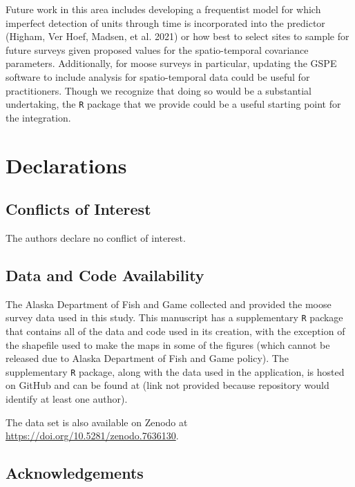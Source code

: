 \documentclass[]{article}    %
\begin{document}
Future work in this area includes developing a frequentist model for
which imperfect detection of units through time is incorporated into the
predictor (Higham, Ver Hoef, Madsen, et al. 2021) or how best to select
sites to sample for future surveys given proposed values for the
spatio-temporal covariance parameters. Additionally, for moose surveys
in particular, updating the GSPE software to include analysis for
spatio-temporal data could be useful for practitioners. Though we
recognize that doing so would be a substantial undertaking, the
\texttt{R} package that we provide could be a useful starting point for
the integration.

\hypertarget{declarations}{%
\section{Declarations}\label{declarations}}

\hypertarget{conflicts-of-interest}{%
\subsection*{Conflicts of Interest}\label{conflicts-of-interest}}

The authors declare no conflict of interest.

\hypertarget{data-and-code-availability}{%
\subsection*{Data and Code
Availability}\label{data-and-code-availability}}

The Alaska Department of Fish and Game collected and provided the moose
survey data used in this study. This manuscript has a supplementary
\texttt{R} package that contains all of the data and code used in its
creation, with the exception of the shapefile used to make the maps in
some of the figures (which cannot be released due to Alaska Department
of Fish and Game policy). The supplementary \texttt{R} package, along
with the data used in the application, is hosted on GitHub and can be
found at (link not provided because repository would identify at least
one author).

The data set is also available on Zenodo at
\url{https://doi.org/10.5281/zenodo.7636130}.

\hypertarget{acknowledgements}{%
\subsection*{Acknowledgements}\label{acknowledgements}}
\end{document}
